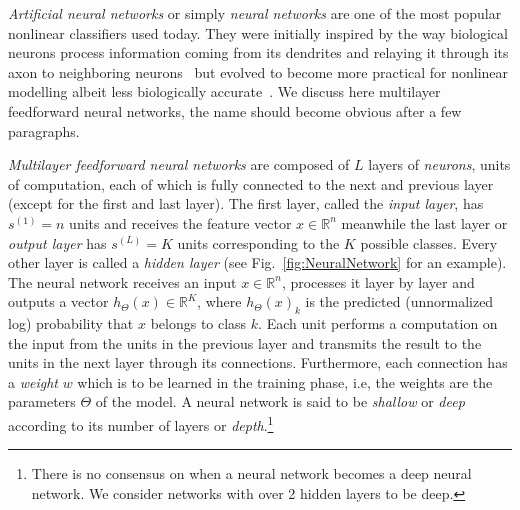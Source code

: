 \emph{Artificial neural networks} or simply \emph{neural networks} are one of the most popular nonlinear classifiers used today. They were initially inspired by the way biological neurons process information coming from its dendrites and relaying it through its axon to neighboring neurons~\cite{McCulloch1943, Widrow1960, Rosenblatt1962} but evolved to become more practical for nonlinear modelling albeit less biologically accurate~\cite{Rumelhart1986}. We discuss here multilayer feedforward neural networks, the name should become obvious after a few paragraphs.

\emph{Multilayer feedforward neural networks} are composed of $L$ layers of \emph{neurons}, units of computation, each of which is fully connected to the next and previous layer (except for the first and last layer). The first layer, called the \emph{input layer}, has $s^{(1)} = n$ units and receives the feature vector $x \in \mathbb{R}^n$ meanwhile the last layer or \emph{output layer} has $s^{(L)} = K$ units corresponding to the $K$ possible classes. Every other layer is called a \emph{hidden layer} (see Fig.~\ref{fig:NeuralNetwork} for an example). The neural network receives an input $x \in \mathbb{R}^n$, processes it layer by layer and outputs a vector $h_\Theta(x) \in \mathbb{R}^K$, where $h_\Theta(x)_k$ is the predicted (unnormalized log) probability that $x$ belongs to class $k$. Each unit performs a computation on the input from the units in the previous layer and transmits the result to the units in the next layer through its connections. Furthermore, each connection has a \emph{weight} $w$ which is to be learned in the training phase, i.e, the weights are the parameters $\Theta$ of the model. A neural network is said to be \emph{shallow} or \emph{deep} according to its number of layers or \emph{depth}.\footnote{There is no consensus on when a neural network becomes a deep neural network\cite{Schmidhuber2015}. We consider networks with over 2 hidden layers to be deep.}

